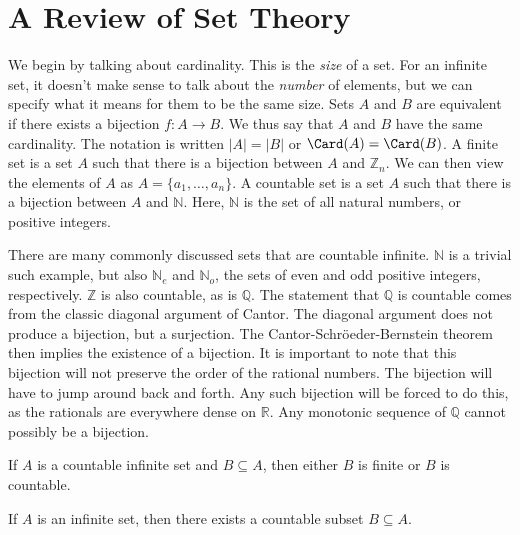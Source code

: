 \documentclass[crop=false,class=book,oneside]{standalone}
\begin{document}
    \section{A Review of Set Theory}
        We begin by talking about cardinality. This is the
        \textit{size} of a set. For an infinite set, it
        doesn't make sense to talk about the \textit{number}
        of elements, but we can specify what it means for them
        to be the same size. Sets $A$ and $B$ are equivalent
        if there exists a bijection $f:A\rightarrow{B}$.
        We thus say that $A$ and $B$ have the same cardinality.
        The notation is written $|A|=|B|$ or
        $\Card(A)=\Card(B)$. A finite set is a set $A$ such that
        there is a bijection between $A$ and $\mathbb{Z}_{n}$.
        We can then view the elements of $A$ as
        $A=\{a_{1},\hdots,a_{n}\}$. A countable set is a set
        $A$ such that there is a bijection between $A$ and
        $\mathbb{N}$. Here, $\mathbb{N}$ is the set of all
        natural numbers, or positive integers.
        \begin{example}
            There are many commonly discussed sets that are
            countable infinite. $\mathbb{N}$ is a trivial
            such example, but also $\mathbb{N}_{e}$ and
            $\mathbb{N}_{o}$, the sets of even and odd positive
            integers, respectively. $\mathbb{Z}$ is also
            countable, as is $\mathbb{Q}$. The statement that
            $\mathbb{Q}$ is countable comes from the classic
            diagonal argument of Cantor. The diagonal argument
            does not produce a bijection, but a surjection.
            The Cantor-Schr\"{o}eder-Bernstein theorem then
            implies the existence of a bijection. It is important
            to note that this bijection will not preserve the
            order of the rational numbers. The bijection will
            have to jump around back and forth. Any such
            bijection will be forced to do this, as the
            rationals are everywhere dense on $\mathbb{R}$.
            Any monotonic sequence of $\mathbb{Q}$ cannot
            possibly be a bijection.
        \end{example}
        \begin{theorem}
            If $A$ is a countable infinite set and
            $B\subseteq{A}$, then either $B$ is finite or
            $B$ is countable.
        \end{theorem}
        \begin{theorem}
            If $A$ is an infinite set, then there exists a
            countable subset $B\subseteq{A}$.
        \end{theorem}
\end{document}
